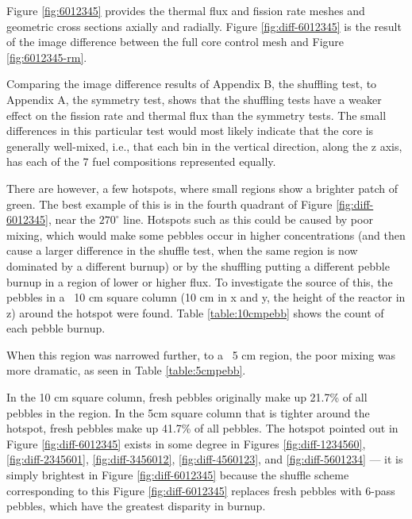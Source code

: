 


Figure \ref{fig:6012345} provides the thermal flux and fission rate meshes and geometric cross sections axially and radially.  Figure \ref{fig:diff-6012345} is the result of the image difference between the full core control mesh and Figure \ref{fig:6012345-rm}.

Comparing the image difference results of Appendix B, the shuffling test, to Appendix A, the symmetry test, shows that the shuffling tests have a weaker effect on the fission rate and thermal flux than the symmetry tests.  The small differences in this particular test would most likely indicate that the core is generally well-mixed, i.e., that each bin in the vertical direction, along the z axis, has each of the 7 fuel compositions represented equally.

There are however, a few hotspots, where small regions show a brighter patch of green.  The best example of this is in the fourth quadrant of Figure \ref{fig:diff-6012345}, near the $270^{\circ}$ line.  Hotspots such as this could be caused by poor mixing, which would make some pebbles occur in higher concentrations (and then cause a larger difference in the shuffle test, when the same region is now dominated by a different burnup) or by the shuffling putting a different pebble burnup in a region of lower or higher flux.  To investigate the source of this, the pebbles in a ~10 cm square column (10 cm in x and y, the height of the reactor in z) around the hotspot were found.  Table \ref{table:10cmpebb} shows the count of each pebble burnup.



When this region was narrowed further, to a ~5 cm region, the poor mixing was more dramatic, as seen in Table \ref{table:5cmpebb}.



In the 10 cm square column, fresh pebbles originally make up 21.7\% of all pebbles in the region.  In the 5cm square column that is tighter around the hotspot, fresh pebbles make up 41.7\% of all pebbles.  The hotspot pointed out in Figure \ref{fig:diff-6012345} exists in some degree in Figures \ref{fig:diff-1234560}, \ref{fig:diff-2345601}, \ref{fig:diff-3456012}, \ref{fig:diff-4560123}, and \ref{fig:diff-5601234} --- it is simply brightest in Figure \ref{fig:diff-6012345} because the shuffle scheme corresponding to this Figure \ref{fig:diff-6012345} replaces fresh pebbles with 6-pass pebbles, which have the greatest disparity in burnup.